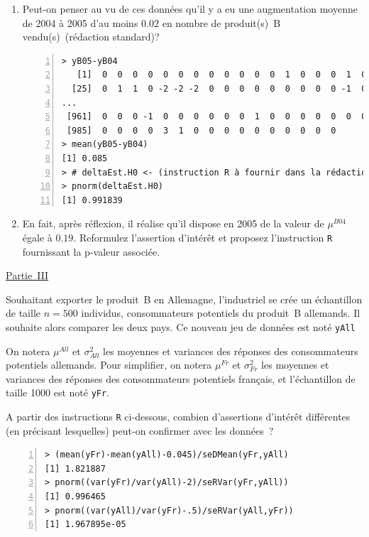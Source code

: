 \documentclass[10pt]{report}
\begin{document}
\begin{exercice}
\begin{enumerate}
\item Peut-on penser au vu de ces données qu'il y a eu une augmentation moyenne de 2004 à 2005 d'au moins $0.02$ en nombre de produit(s)~B vendu(s)~(rédaction standard)? 

\IndicR
\begin{Verbatim}[frame=leftline,fontfamily=tt,fontshape=n,numbers=left]
> yB05-yB04
   [1]  0  0  0  0  0  0  0  0  0  0  0  0  1  0  0  0  1  0  0  0  0 -2  0  0
  [25]  0  1  1  0 -2 -2 -2  0  0  0  0  0  0  0  0  0 -1  0  0  3  0  0  0  0
...
 [961]  0  0  0 -1  0  0  0  0  0  0  1  0  0  0  0  0  0  0 -1 -2  0  1  0  0
 [985]  0  0  0  0  3  1  0  0  0  0  0  0  0  0  0  0
> mean(yB05-yB04)
[1] 0.085
> # deltaEst.H0 <- (instruction R à fournir dans la rédaction)
> pnorm(deltaEst.H0)
[1] 0.991839
\end{Verbatim}

 




\item En fait, après réflexion, il réalise qu'il dispose  en 2005 de la valeur de $\mu^{B04}$ égale à $0.19$. Reformulez l'assertion d'intérêt et proposez l'instruction \texttt{R} fournissant la p-valeur associée.


\end{enumerate}

\noindent \underline{Partie~III}

Souhaitant exporter le produit~B en Allemagne, l'industriel se crée un échantillon de taille $n=500$ individus, consommateurs potentiels du produit~B allemands. Il souhaite alors comparer les deux pays. Ce nouveau jeu de données est noté \texttt{yAll}

On notera $\mu^{All}$ et $\sigma^2_{All}$ les moyennes et variances des réponses des consommateurs potentiels allemands. Pour simplifier, on notera $\mu^{Fr}$ et $\sigma^2_{Fr}$  les moyennes et variances des réponses des consommateurs potentiels français, et l'échantillon de taille 1000 est noté \texttt{yFr}. 

A partir des instructions \texttt{R} ci-dessous, combien d'assertions d'intérêt différentes (en précisant lesquelles) peut-on confirmer avec les données~?

\begin{Verbatim}[frame=leftline,fontfamily=tt,fontshape=n,numbers=left]
> (mean(yFr)-mean(yAll)-0.045)/seDMean(yFr,yAll)
[1] 1.821887
> pnorm((var(yFr)/var(yAll)-2)/seRVar(yFr,yAll))
[1] 0.996465
> pnorm((var(yAll)/var(yFr)-.5)/seRVar(yAll,yFr))
[1] 1.967895e-05
\end{Verbatim}



\end{exercice}
\end{document}
